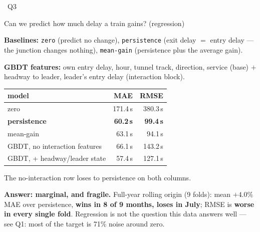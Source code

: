 \documentclass[aspectratio=169,10pt]{beamer}
\newcommand{\srcnote}[1]{{\scriptsize\color{ink3}#1}}
\newcommand{\hl}[1]{{\color{corange}\textbf{#1}}}
\newcommand{\qtag}[1]{{\scriptsize\color{surface}\colorbox{cblue}{\strut~Q#1~}}}
\begin{document}
\begin{frame}{\qtag{3} Can we predict how much delay a train gains? (regression)}
  \textbf{Baselines:} \texttt{zero} (predict no change), \texttt{persistence}
  (exit delay $=$ entry delay --- the junction changes nothing), \texttt{mean-gain}
  (persistence plus the average gain).

  \vspace{0.3em}
  \srcnote{\textbf{GBDT features:} own entry delay, hour, tunnel track, direction,
  service \srcnote{(base)} $+$ headway to leader, leader's entry delay
  \srcnote{(interaction block)}.}

  \vspace{0.4em}
  \centering
  \begin{tabular}{@{}lrr@{}}
    \toprule
    model & MAE & RMSE \\
    \midrule
    zero & 171.4\,s & 380.3\,s \\
    \textbf{persistence} & \textbf{60.2\,s} & \textbf{99.4\,s} \\
    mean-gain & 63.1\,s & 94.1\,s \\
    GBDT, no interaction features & 66.1\,s & 143.2\,s \\
    GBDT, + headway/leader state & 57.4\,s & 127.1\,s \\
    \bottomrule
  \end{tabular}

  \vspace{0.3em}

  \srcnote{The no-interaction row loses to persistence on both columns.}

  \vspace{0.6em}
  \textbf{Answer: marginal, and fragile.} Full-year rolling origin (9 folds): mean
  $+4.0\%$ MAE over persistence, \textbf{wins in 8 of 9 months, loses in July}; RMSE
  is \hl{worse in every single fold}. Regression is not the question this data
  answers well --- see Q1: most of the target is 71\% noise around zero.
\end{frame}
\end{document}
